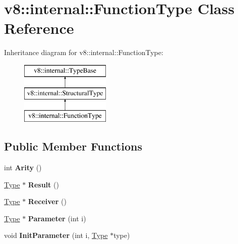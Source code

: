 \hypertarget{classv8_1_1internal_1_1_function_type}{}\section{v8\+:\+:internal\+:\+:Function\+Type Class Reference}
\label{classv8_1_1internal_1_1_function_type}
Inheritance diagram for v8\+:\+:internal\+:\+:Function\+Type\+:\begin{figure}[H]
\begin{center}
\leavevmode
\includegraphics[height=3.000000cm]{classv8_1_1internal_1_1_function_type}
\end{center}
\end{figure}
\subsection*{Public Member Functions}
\begin{DoxyCompactItemize}
\item 
int {\bfseries Arity} ()\hypertarget{classv8_1_1internal_1_1_function_type_a5345c6c22d5259383b25744dde4c1d2e}{}\label{classv8_1_1internal_1_1_function_type_a5345c6c22d5259383b25744dde4c1d2e}

\item 
\hyperlink{classv8_1_1internal_1_1_type}{Type} $\ast$ {\bfseries Result} ()\hypertarget{classv8_1_1internal_1_1_function_type_adfe3b94046dfd778a33a2cb67b364f65}{}\label{classv8_1_1internal_1_1_function_type_adfe3b94046dfd778a33a2cb67b364f65}

\item 
\hyperlink{classv8_1_1internal_1_1_type}{Type} $\ast$ {\bfseries Receiver} ()\hypertarget{classv8_1_1internal_1_1_function_type_a115a21219f0915dffce9c539d45a7bfc}{}\label{classv8_1_1internal_1_1_function_type_a115a21219f0915dffce9c539d45a7bfc}

\item 
\hyperlink{classv8_1_1internal_1_1_type}{Type} $\ast$ {\bfseries Parameter} (int i)\hypertarget{classv8_1_1internal_1_1_function_type_ab933618044e741b75ce56f61456a9908}{}\label{classv8_1_1internal_1_1_function_type_ab933618044e741b75ce56f61456a9908}

\item 
void {\bfseries Init\+Parameter} (int i, \hyperlink{classv8_1_1internal_1_1_type}{Type} $\ast$type)\hypertarget{classv8_1_1internal_1_1_function_type_a05e96f8bc766fb2561b11c513ac115c0}{}\label{classv8_1_1internal_1_1_function_type_a05e96f8bc766fb2561b11c513ac115c0}

\end{DoxyCompactItemize}
